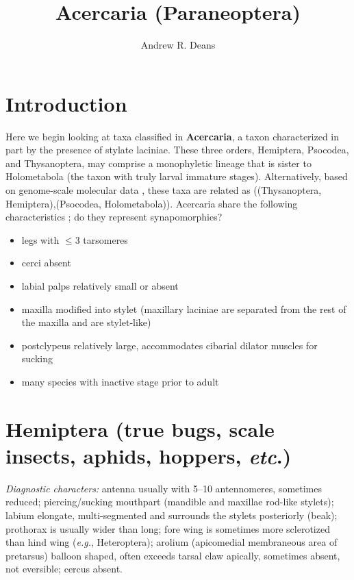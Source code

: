 \documentclass[letterpaper, 11pt]{article}
\title{Acercaria (Paraneoptera)}
\author{Andrew R. Deans}
\begin{document}
\cleanlookdateon %
\maketitle
\thispagestyle{fancy}
\section*{Introduction}
Here we begin looking at taxa classified in \textbf{Acercaria}, a taxon characterized in part by the presence of stylate laciniae. These three orders, Hemiptera, Psocodea, and Thysanoptera, may comprise a monophyletic lineage that is sister to Holometabola (the taxon with truly larval immature stages). Alternatively, based on genome-scale molecular data \citep{Misof763}, these taxa are related as ((Thysanoptera, Hemiptera),(Psocodea, Holometabola)). Acercaria share the following characteristics \citep{beutel2013insect}; do they represent synapomorphies?

\begin{itemize}
\item legs with $\le$3 tarsomeres
\item cerci absent 
\item labial palps relatively small or absent 
\item maxilla modified into stylet (maxillary laciniae are separated from the rest of the maxilla and are stylet-like)
\item postclypeus relatively large, accommodates cibarial dilator muscles for sucking
\item many species with inactive stage prior to adult
\end{itemize}

\section{Hemiptera (true bugs, scale insects, aphids, hoppers, \textit{etc}.)}
\noindent{}\textit{Diagnostic characters:} antenna usually with 5--10 antennomeres, sometimes reduced; piercing/sucking mouthpart (mandible and maxillae rod-like stylets); labium elongate, multi-segmented and surrounds the stylets posteriorly (beak); prothorax is usually wider than long; fore wing is sometimes more sclerotized than hind wing (\textit{e.g.}, Heteroptera); arolium (apicomedial membraneous area of pretarsus) balloon shaped, often exceeds tarsal claw apically, sometimes absent, not eversible; cercus absent.\\
\end{document}
